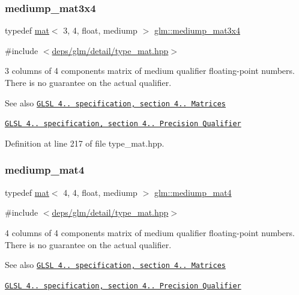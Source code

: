\subsubsection{\texorpdfstring{mediump\+\_\+mat3x4}{mediump\_mat3x4}}
{\footnotesize\ttfamily typedef \hyperlink{structglm_1_1mat}{mat}$<$ 3, 4, float, mediump $>$ \hyperlink{group__core__precision_ga61dd8c2c7fd60c1343a6b3aca7f86c25}{glm\+::mediump\+\_\+mat3x4}}



{\ttfamily \#include $<$\hyperlink{type__mat_8hpp}{deps/glm/detail/type\+\_\+mat.\+hpp}$>$}

3 columns of 4 components matrix of medium qualifier floating-\/point numbers. There is no guarantee on the actual qualifier.

\begin{DoxySeeAlso}{See also}
\href{http://www.opengl.org/registry/doc/GLSLangSpec.4.20.8.pdf}{\tt G\+L\+SL 4.. specification, section 4.. Matrices} 

\href{http://www.opengl.org/registry/doc/GLSLangSpec.4.20.8.pdf}{\tt G\+L\+SL 4.. specification, section 4.. Precision Qualifier} 
\end{DoxySeeAlso}


Definition at line 217 of file type\+\_\+mat.\+hpp.

\mbox{\label{group__core__precision_ga0987ea03f27d035ebd79fd71ca394be1}} 
\subsubsection{\texorpdfstring{mediump\+\_\+mat4}{mediump\_mat4}}
{\footnotesize\ttfamily typedef \hyperlink{structglm_1_1mat}{mat}$<$ 4, 4, float, mediump $>$ \hyperlink{group__core__precision_ga0987ea03f27d035ebd79fd71ca394be1}{glm\+::mediump\+\_\+mat4}}



{\ttfamily \#include $<$\hyperlink{type__mat_8hpp}{deps/glm/detail/type\+\_\+mat.\+hpp}$>$}

4 columns of 4 components matrix of medium qualifier floating-\/point numbers. There is no guarantee on the actual qualifier.

\begin{DoxySeeAlso}{See also}
\href{http://www.opengl.org/registry/doc/GLSLangSpec.4.20.8.pdf}{\tt G\+L\+SL 4.. specification, section 4.. Matrices} 

\href{http://www.opengl.org/registry/doc/GLSLangSpec.4.20.8.pdf}{\tt G\+L\+SL 4.. specification, section 4.. Precision Qualifier} 
\end{DoxySeeAlso}


